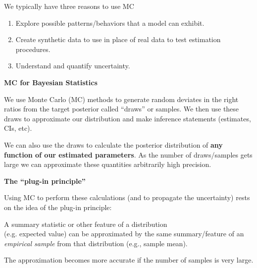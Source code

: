 \documentclass[12pt,xcolor=svgnames]{beamer}
\newcommand{\bl}{\color{blue}}
\newcommand{\theme}{\color{FireBrick}}
\newcommand{\sk}{\vspace{.4cm}}
\newcommand{\nochap}{\vspace{0.5cm}}
\newcommand{\chap}[1]{{\theme \Large \bf #1} \sk}
\begin{document}
\begin{frame}
\nochap%

We typically have three reasons to use MC
\begin{enumerate}
\item Explore possible patterns/behaviors that a model can exhibit.
\item Create synthetic data to use in place of real data to test estimation procedures.
\item Understand and quantify uncertainty.
\end{enumerate}

\vfill

\end{frame}


\begin{frame}
\chap{MC for Bayesian Statistics}

We use Monte Carlo (MC) methods to generate random deviates in the right ratios from the target posterior called ``{\bl draws}'' or samples. We then use these draws to approximate our distribution and make inference statements (estimates, CIs, etc). 

\sk
We can also use the draws to calculate the posterior distribution of {\bf \bl any function of our estimated parameters}. As the number of draws/samples gets large we can approximate these quantities arbitrarily high precision.

\end{frame}


\begin{frame}
\chap{The ``plug-in principle''}

Using MC to perform these calculations (and to propagate the uncertainty) rests on the idea of the plug-in principle:\\
\begin{center}
{\bl A summary statistic or other feature of a distribution \\ (e.g. expected value) can be approximated by the same summary/feature of an {\it empirical sample} from that distribution (e.g., sample mean).}\\
\end{center}

The approximation becomes more accurate if the number of samples is very large.
\sk

\end{frame}
\end{document}
